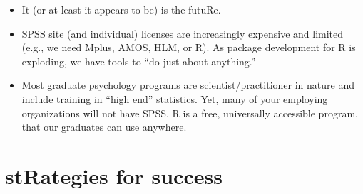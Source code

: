 \documentclass[
  11pt,
]{book}
\providecommand{\tightlist}{%
  \setlength{\itemsep}{0pt}\setlength{\parskip}{0pt}}
\begin{document}
\begin{itemize}
\tightlist
\item
  It (or at least it appears to be) is the futuRe.
\item
  SPSS site (and individual) licenses are increasingly expensive and limited (e.g., we need Mplus, AMOS, HLM, or R). As package development for R is exploding, we have tools to ``do just about anything.''
\item
  Most graduate psychology programs are scientist/practitioner in nature and include training in ``high end'' statistics. Yet, many of your employing organizations will not have SPSS. R is a free, universally accessible program, that our graduates can use anywhere.
\end{itemize}

\hypertarget{strategies-for-success}{%
\section{stRategies for success}\label{strategies-for-success}}
\end{document}
